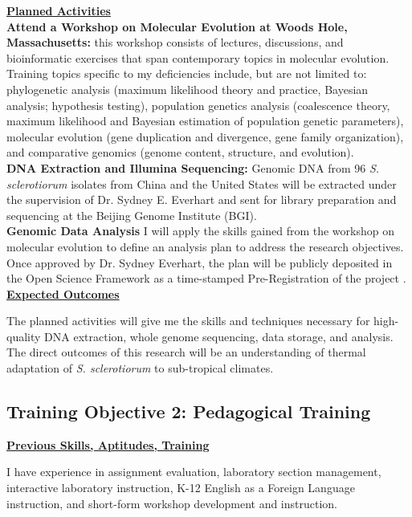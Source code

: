 \documentclass[12pt,letterpaper]{article}
\begin{document}
\noindent \textbf{\underline{Planned Activities}}\\
\noindent \textbf{Attend a Workshop on Molecular Evolution at Woods Hole, Massachusetts:} this workshop consists of lectures, discussions, and bioinformatic exercises that span contemporary topics in molecular evolution. Training topics specific to my deficiencies include, but are not limited to: phylogenetic analysis (maximum likelihood theory and practice, Bayesian analysis; hypothesis testing), population genetics analysis (coalescence theory, maximum likelihood and Bayesian estimation of population genetic parameters), molecular evolution (gene duplication and divergence, gene family organization), and comparative genomics (genome content, structure, and evolution).\\
\noindent \textbf{DNA Extraction and Illumina Sequencing:} Genomic DNA from 96 \textit{S. sclerotiorum} isolates from China and the United States will be extracted under the supervision of Dr. Sydney E. Everhart and sent for library preparation and sequencing at the Beijing Genome Institute (BGI). \\
\noindent \textbf{Genomic Data Analysis} I will apply the skills gained from the workshop on molecular evolution to define an analysis plan to address the research objectives. Once approved by Dr. Sydney Everhart, the plan will be publicly deposited in the Open Science Framework as a time-stamped Pre-Registration of the project \citep{nosek2017osf}.\\

\noindent \textbf{\underline{Expected Outcomes}}

The planned activities will give me the skills and techniques necessary for high-quality DNA extraction, whole genome sequencing, data storage, and analysis. The direct outcomes of this research will be an understanding of thermal adaptation of \textit{S. sclerotiorum} to sub-tropical climates.

\subsection{Training Objective 2: Pedagogical Training}

\noindent \textbf{\underline{Previous Skills, Aptitudes, Training}}

I have experience in assignment evaluation, laboratory section management, interactive laboratory instruction, K-12 English as a Foreign Language instruction, and short-form workshop development and instruction.\\
\end{document}
